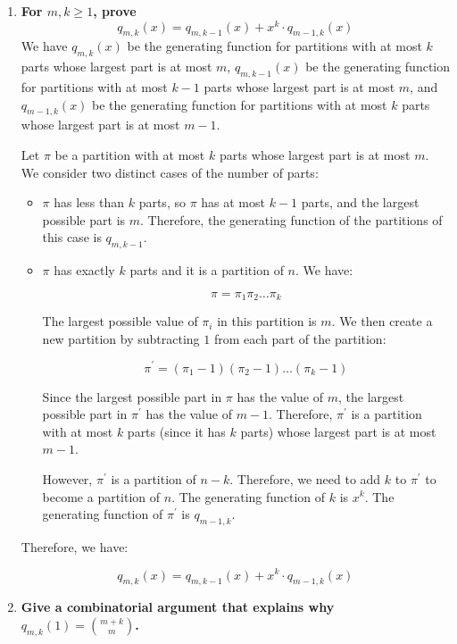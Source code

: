 \documentclass[10pt]{article}
\begin{document}
\begin{enumerate}
\begin{enumerate}
	\item
	\textbf{For  $m,k\geq 1$, prove   $$q_{m,k}(x)=q_{m,k-1}(x)+x^k\cdot q_{m-1,k}(x)$$}
        We have $q_{m,k}(x)$ be the generating function for partitions with at most $k$ parts whose largest part is at most $m$, $q_{m,k-1}(x)$ be the generating function for partitions with at most $k-1$ parts whose largest part is at most $m$, and $q_{m-1,k}(x)$ be the generating function for partitions with at most $k$ parts whose largest part is at most $m-1$.

        Let $\pi$ be a partition with at most $k$ parts whose largest part is at most $m$. We consider two distinct cases of the number of parts:

        \begin{itemize}
            \item $\pi$ has less than $k$ parts, so $\pi$ has at most $k-1$ parts, and the largest possible part is $m$. Therefore, the generating function of the partitions of this case is $q_{m,k-1}$. 
            
            \item $\pi$ has exactly $k$ parts and it is a partition of $n$. We have:

            $$\pi = \pi_1\pi_2\ldots\pi_k$$

            The largest possible value of $\pi_i$ in this partition is $m$. We then create a new partition by subtracting $1$ from each part of the partition:

            $$\pi^{'} = (\pi_1-1)(\pi_2-1)\ldots(\pi_k-1)$$

            Since the largest possible part in $\pi$ has the value of $m$, the largest possible part in $\pi^{'}$ has the value of $m-1$. Therefore, $\pi^{'}$ is a partition with at most $k$ parts (since it has $k$ parts) whose largest part is at most $m-1$. 

            However, $\pi^{'}$ is a partition of $n-k$. Therefore, we need to add $k$ to $\pi^{'}$ to become a partition of $n$. The generating function of $k$ is $x^k$. The generating function of $\pi^{'}$ is $q_{m-1,k}$.
            
         \end{itemize}
        Therefore, we have:

        $$q_{m,k}(x)=q_{m,k-1}(x)+x^k\cdot q_{m-1,k}(x)$$
        
	\item
	\textbf{Give a combinatorial argument that explains why $q_{m,k}(1)=\binom{m+k}{m}$.}\\


\end{enumerate}
\end{enumerate}
\end{document}
